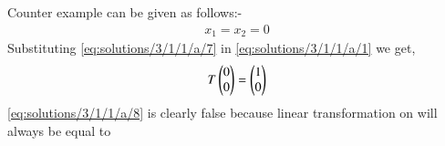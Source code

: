 Counter example can be given as follows:-
\begin{align}
    x_1=x_2=0\label{eq:solutions/3/1/1/a/7}
\end{align}
Substituting \eqref{eq:solutions/3/1/1/a/7} in \eqref{eq:solutions/3/1/1/a/1} we get,
\begin{align}
    T\begin{pmatrix}0\\0\end{pmatrix}=\begin{pmatrix}1\\0\end{pmatrix}\label{eq:solutions/3/1/1/a/8}
\end{align}
\eqref{eq:solutions/3/1/1/a/8} is clearly false because linear transformation on  will always be equal to 

